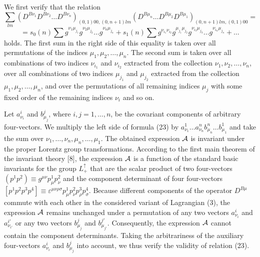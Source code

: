 \documentclass[a4paper,12pt]{article}
\begin{document}
We first verify that the relation 
$$\sum_{lm} \left( D^{B\nu_{1}}D^{B\nu_{2}} \ldots D^{B\nu_{n}}
\right)_{(0,1)00,(0,n+1)lm} \left( D^{B\mu_{n}} \ldots 
D^{B\mu_{2}}D^{B\mu_{1}} \right)_{(0,n+1)lm,(0,1)00}=$$
\begin{equation}
= s_{0}(n) \sum g^{\nu_{1} \mu_{j_{1}} } g^{\nu_{2} \mu_{j_{2}} }
\ldots g^{\nu_{n} \mu_{j_{n}} }
+ s_{1}(n) \sum g^{\nu_{i_{1}} \nu_{i_{2}} } g^{\mu_{j_{1}} \mu_{j_{2}} }
g^{\nu_{i_{3}} \mu_{j_{3}} }...g^{\nu_{i_{n}} \mu_{j_{n}} } + \ldots 
\end{equation}
holds. The first sum in the right side of this equality is taken over all
permutations of the indices $\mu_{1}, \mu_{2}, \ldots , \mu_{n}$. The second
sum is taken over all combinations of two indices $\nu_{i_{1}}$ and 
$\nu_{i_{2}}$ extracted from the collection $\nu_{1},\nu_{2},\ldots , \nu_{n}$,
over all combinations of two indices $\mu_{j_{1}}$ and $\mu_{j_{2}}$ extracted
from the collection $\mu_{1}, \mu_{2}, \ldots , \mu_{n}$, and over the
permutations of all remaining indices $\mu_{j}$ with some fixed order of the
remaining indices $\nu_{i}$ and so on.

Let $a^{i}_{\nu_{i}}$ and $b^{j}_{\mu_{j}}$, where $i,j=1,\ldots, n$, be
the covariant components of arbitrary four-vectors. We multiply the left side 
of formula (23) by $a^{1}_{\nu_{1}}\ldots a^{n}_{\nu_{n}}b^{n}_{\mu_{n}}\ldots 
b^{1}_{\mu_{1}}$ and take the sum over $\nu_{1},\ldots, \nu_{n},\mu_{n},\ldots, 
\mu_{1}$. The obtained expression ${\cal A}$ is invariant under the proper
Lorentz group transformations. According to the first main theorem of the
invariant theory [8], the expression ${\cal A}$ is a function of the standard
basic invariants for the group $L^{\uparrow}_{+}$ that are the scalar product 
of two four-vectors $(p^{1}p^{2}) \equiv g^{\mu\nu}p^{1}_{\mu}p^{2}_{\nu}$ and
the component determinant of four four-vectors $[p^{1}p^{2}p^{3}p^{4}] \equiv 
\varepsilon^{\mu\nu\rho\sigma} p^{1}_{\mu}p^{2}_{\nu}p^{3}_{\rho}
p^{4}_{\sigma}$. Because different components of the operator $D^{B\mu}$
commute with each other in the considered variant of Lagrangian (3), the
expression ${\cal A}$ remains unchanged under a permutation of any two vectors 
$a^{i}_{\nu_{i}}$ and $a^{i'}_{\nu_{i'}}$ or any two vectors $b^{j}_{\mu_{j}}$ 
and $b^{j'}_{\mu_{j'}}$. Consequently, the expression ${\cal A}$ cannot contain
the component determinants. Taking the arbitrariness of the auxiliary
four-vectors $a^{i}_{\nu_{i}}$ and $b^{j}_{\mu_{j}}$ into account, we thus
verify the validity of relation (23).
\end{document}
